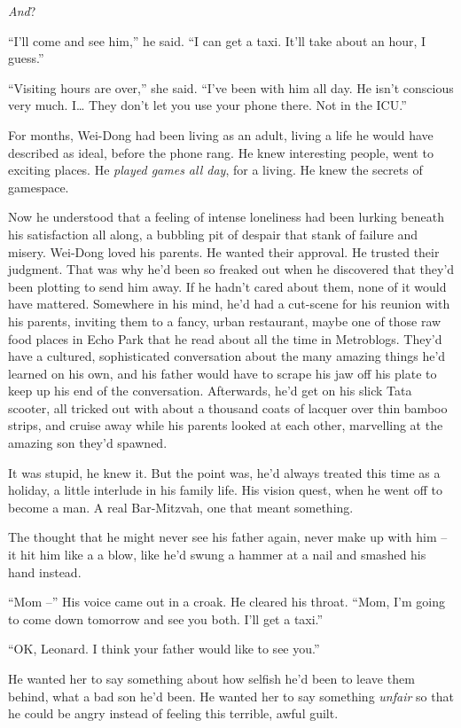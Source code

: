 \emph{And}?

``I'll come and see him,'' he said. ``I can get a taxi. It'll take
about an hour, I guess.''

``Visiting hours are over,'' she said. ``I've been with him all day.
He isn't conscious very much. I\ldots{} They don't let you use your
phone there. Not in the ICU.''

For months, Wei-Dong had been living as an adult, living a life he
would have described as ideal, before the phone rang. He knew
interesting people, went to exciting places. He
\emph{played games all day}, for a living. He knew the secrets of
gamespace.

Now he understood that a feeling of intense loneliness had been
lurking beneath his satisfaction all along, a bubbling pit of
despair that stank of failure and misery. Wei-Dong loved his
parents. He wanted their approval. He trusted their judgment. That
was why he'd been so freaked out when he discovered that they'd
been plotting to send him away. If he hadn't cared about them, none
of it would have mattered. Somewhere in his mind, he'd had a
cut-scene for his reunion with his parents, inviting them to a
fancy, urban restaurant, maybe one of those raw food places in Echo
Park that he read about all the time in Metroblogs. They'd have a
cultured, sophisticated conversation about the many amazing things
he'd learned on his own, and his father would have to scrape his
jaw off his plate to keep up his end of the conversation.
Afterwards, he'd get on his slick Tata scooter, all tricked out
with about a thousand coats of lacquer over thin bamboo strips, and
cruise away while his parents looked at each other, marvelling at
the amazing son they'd spawned.

It was stupid, he knew it. But the point was, he'd always treated
this time as a holiday, a little interlude in his family life. His
vision quest, when he went off to become a man. A real Bar-Mitzvah,
one that meant something.

The thought that he might never see his father again, never make up
with him -- it hit him like a a blow, like he'd swung a hammer at a
nail and smashed his hand instead.

``Mom --'' His voice came out in a croak. He cleared his throat.
``Mom, I'm going to come down tomorrow and see you both. I'll get a
taxi.''

``OK, Leonard. I think your father would like to see you.''

He wanted her to say something about how selfish he'd been to leave
them behind, what a bad son he'd been. He wanted her to say
something \emph{unfair} so that he could be angry instead of
feeling this terrible, awful guilt.


